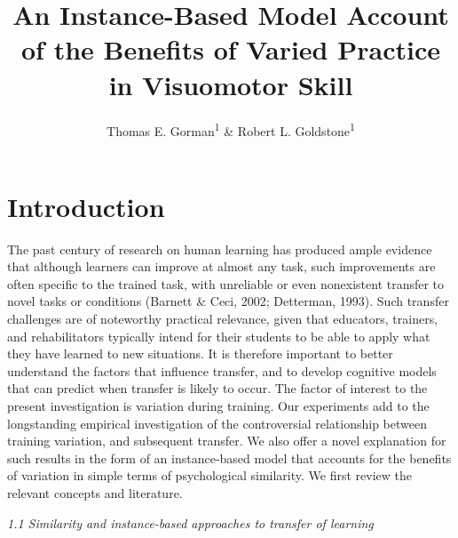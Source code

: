 \documentclass[
  man,floatsintext]{apa7}
\title{An Instance-Based Model Account of the Benefits of Varied Practice in Visuomotor Skill}
\author{Thomas E. Gorman\textsuperscript{1} \& Robert L. Goldstone\textsuperscript{1}}
\date{}
\affiliation{\vspace{0.5cm}\textsuperscript{1} Indiana University - Bloomington}
\begin{document}
\maketitle

\hypertarget{introduction}{%
\section{Introduction}\label{introduction}}

The past century of research on human learning has produced ample evidence that although learners can improve at almost any task, such improvements are often specific to the trained task, with unreliable or even nonexistent transfer to novel tasks or conditions (Barnett \& Ceci, 2002; Detterman, 1993). Such transfer challenges are of noteworthy practical relevance, given that educators, trainers, and rehabilitators typically intend for their students to be able to apply what they have learned to new situations. It is therefore important to better understand the factors that influence transfer, and to develop cognitive models that can predict when transfer is likely to occur. The factor of interest to the present investigation is variation during training. Our experiments add to the longstanding empirical investigation of the controversial relationship between training variation, and subsequent transfer. We also offer a novel explanation for such results in the form of an instance-based model that accounts for the benefits of variation in simple terms of psychological similarity. We first review the relevant concepts and literature.

\emph{1.1 Similarity and instance-based approaches to transfer of learning}
\end{document}
